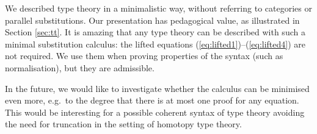 \documentclass[submission,copyright,creativecommons]{eptcs}
\newcommand{\Sub}{\mathsf{Sub}}
\newcommand{\Type}{\mathsf{Type}}
\begin{document}
We described type theory in a minimalistic way, without referring to
categories or parallel substitutions. Our presentation has pedagogical
value, as illustrated in Section \ref{sec:tt}.
%
It is amazing that any type theory can be described with such a
minimal substitution calculus: the lifted equations
(\ref{eq:lifted1})--(\ref{eq:lifted4}) are not required. We use them
when proving properties of the syntax (such as normalisation), but
they are admissible.

In the future, we would like to investigate whether the calculus can
be minimised even more, e.g.\ to the degree that there is at most one
proof for any equation. This would be interesting for a possible
coherent syntax of type theory avoiding the need for truncation in the
setting of homotopy type theory.

% 
\end{document}
